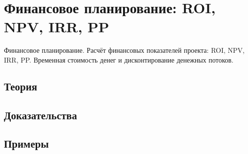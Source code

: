 
\section{Финансовое планирование: ROI, NPV, IRR, PP}
\label{sec:2.6.17-financial-planning}

\begin{ticket}
Финансовое планирование. Расчёт финансовых показателей проекта: ROI, NPV, IRR, PP. Временная стоимость денег и дисконтирование денежных потоков.
\end{ticket}

\subsection*{Теория}

\subsection*{Доказательства}

\subsection*{Примеры}
